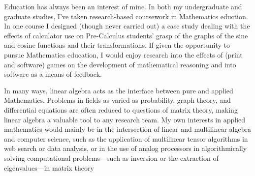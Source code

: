 \documentclass[11pt]{article}
\begin{document}
Education has always been an interest of mine. In both my undergraduate and graduate studies, I've taken research-based coursework in Mathematics eduction. In one course I designed (though never carried out) a case study dealing with the effects of calculator use on Pre-Calculus students' grasp of the graphs of the sine and cosine functions and their transformations. If given the opportunity to pursue Mathematics education, I would enjoy research into the effects of (print and software) games on the development of mathematical reasoning and into software as a means of feedback.

In many ways, linear algebra acts as the interface between pure and applied Mathematics. Problems in fields as varied as probability, graph theory, and differential equations are often reduced to questions of matrix theory, making linear algebra a valuable tool to any research team. My own interests in applied mathematics would mainly be in the intersection of linear and multilinear algebra and computer science, such as the application of multilinear tensor algorithms in web search or data analysis, or in the use of analog processors in algorithmically solving computational problems---such as inversion or the extraction of eigenvalues---in matrix theory

\printbibliography[heading=none]

\label{page:last}
\end{document}
